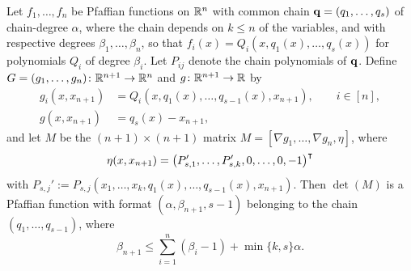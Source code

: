\begin{lemma}\label{lem:rolle-det-degree}
Let $f_1,\dots,f_n$ be Pfaffian functions on $\mathbb{R}^n$ with common chain $\mathbf{q} = (q_1,\dots,q_s)$ of chain-degree $\alpha$, where the chain depends on $k\leq n$ of the variables, and with respective degrees $\beta_1,\dots,\beta_n$, so that $f_i(x) = Q_i(x, q_1(x),\dots,q_s(x))$ for polynomials $Q_i$ of degree $\beta_i$. Let $P_{ij}$ denote the chain polynomials of $\mathbf{q}$. Define $G = (g_1,\dots,g_n)\colon \mathbb{R}^{n+1}\to \mathbb{R}^n$ and $g\colon \mathbb{R}^{n+1}\to \mathbb{R}$ by
\begin{align*}
  g_i(x, x_{n+1}) &= Q_i(x, q_1(x),\dots,q_{s-1}(x), x_{n+1}), \qquad i\in [n],\\
  g(x, x_{n+1}) &= q_s(x) - x_{n+1},
\end{align*}
and let $M$ be the $(n+1)\times (n+1)$ matrix $M = [\nabla g_1, \dots, \nabla g_n, \eta]$, where
\begin{equation*}
  \eta(x, x_{n+1}) = \bigl(P_{s,1}',\dots,P_{s,k}', 0,\dots,0, -1\bigr)^{\intercal}
\end{equation*}
with $P_{s,j}' := P_{s,j}(x_1,\dots,x_k, q_1(x),\dots,q_{s-1}(x), x_{n+1})$. 
Then $\det(M)$ is a Pfaffian function with format $(\alpha, \beta_{n+1}, s-1)$ belonging to the chain $(q_1,\dots,q_{s-1})$, where
\begin{equation}\label{eqn:rolle-det-degree}
  \beta_{n+1} \leq \sum_{i=1}^n (\beta_i - 1) + \min\{k, s\}\alpha.
\end{equation}
\end{lemma}

